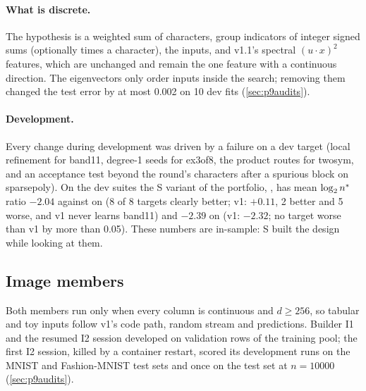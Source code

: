 \paragraph{What is discrete.} The hypothesis is a weighted sum of characters, group indicators of integer signed sums (optionally times a character), the inputs, and v1.1's spectral $(u\cdot x)^2$ features, which are unchanged and remain the one feature with a continuous direction. The eigenvectors only order inputs inside the search; removing them changed the test error by at most 0.002 on 10 dev fits (\cref{sec:p9audits}).

\paragraph{Development.} Every change during development was driven by a failure on a dev target (local refinement for band11, degree-1 seeds for ex3of8, the product routes for twosym, and an acceptance test beyond the round's characters after a spurious block on sparsepoly). On the dev suites the S variant of the portfolio, , has mean $\log_2n^{*}$ ratio $-2.04$ against  on  (8 of 8 targets clearly better; v1: $+0.11$, 2 better and 5 worse, and v1 never learns band11) and $-2.39$ on  (v1: $-2.32$; no target worse than v1 by more than 0.05). These numbers are in-sample: S built the design while looking at them.

\subsection{Image members}\label{sec:p9img}

Both members run only when every column is continuous and $d\ge256$, so tabular and toy inputs follow v1's code path, random stream and predictions. Builder I1 and the resumed I2 session developed on validation rows of the training pool; the first I2 session, killed by a container restart, scored its development runs on the MNIST and Fashion-MNIST test sets and once on the  test set at $n=10000$ (\cref{sec:p9audits}).

